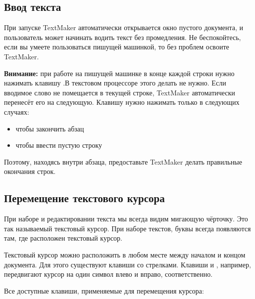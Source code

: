 \documentclass[a4paper,10pt]{article}
\begin{document}
\subsection{Ввод текста}
При запуске TextMaker автоматически открывается окно пустого документа, и пользователь может начинать водить текст без промедления. Не беспокойтесь, если вы умеете пользоваться пишущей машинкой, то без проблем освоите TextMaker.

\begin{mdframed}[backgroundcolor=blue!10]
\textbf{Внимание:} при работе на пишущей машинке в конце каждой строки нужно нажимать клавишу .В текстовом процессоре этого делать не нужно. Если вводимое слово не помещается в текущей строке, TextMaker автоматически перенесёт его на следующую. Клавишу  нужно нажимать только в следующих случаях:
\end{mdframed}

\begin{itemize}
 \item чтобы закончить абзац
 \item чтобы ввести пустую строку
\end{itemize}

Поэтому, находясь внутри абзаца, предоставьте TextMaker делать правильные окончания строк.

\subsection{Перемещение текстового курсора}
При наборе и редактировании текста мы всегда видим мигающую чёрточку. Это так называемый текстовый курсор. При наборе текстов, буквы всегда появляются там, где расположен текстовый курсор.

Текстовый курсор можно расположить в любом месте между началом и концом документа. Для этого существуют клавиши со стрелками. Клавиши  и , например, передвигают курсор на один символ влево и вправо, соответственно.

Все доступные клавиши, применяемые для перемещения курсора:
\end{document}
